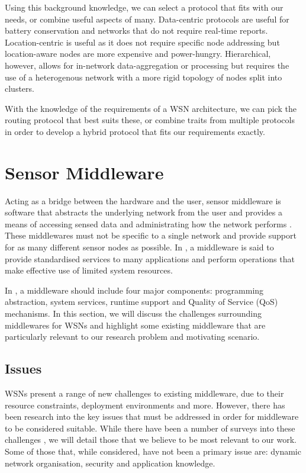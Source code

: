 Using this background knowledge, we can select a protocol that fits with our needs, or combine useful aspects of many. Data-centric protocols are useful for battery conservation and networks that do not require real-time reports. Location-centric is useful as it does not require specific node addressing but location-aware nodes are more expensive and power-hungry. Hierarchical, however, allows for in-network data-aggregation or processing but requires the use of a heterogenous network with a more rigid topology of nodes split into clusters.

With the knowledge of the requirements of a WSN architecture, we can pick the routing protocol that best suits these, or combine traits from multiple protocols in order to develop a hybrid protocol that fits our requirements exactly.
\section{Sensor Middleware} \label{bg:sm}
	Acting as a bridge between the hardware and the user, sensor middleware is software that abstracts the underlying network from the user and provides a means of accessing sensed data and administrating how the network performs \cite{Hadim2006a}. These middlewares must not be specific to a single network and provide support for as many different sensor nodes as possible. In \cite{Yu2004}, a middleware is said to provide standardised services to many applications and perform operations that make effective use of limited system resources.

	In \cite{Wang2008c}, a middleware should include four major components: programming abstraction, system services, runtime support and Quality of Service (QoS) mechanisms. In this section, we will discuss the challenges surrounding middlewares for WSNs and highlight some existing middleware that are particularly relevant to our research problem and motivating scenario.

\subsection{Issues}\label{bg:sm:issues}
	WSNs present a range of new challenges to existing middleware, due to their resource constraints, deployment environments and more. However, there has been research into the key issues that must be addressed in order for middleware to be considered suitable.
	While there have been a number of surveys into these challenges \cite{Hadim2006, Rahman, Yu2004}, we will detail those that we believe to be most relevant to our work. Some of those that, while considered, have not been a primary issue are: dynamic network organisation, security and application knowledge.
